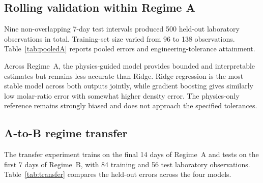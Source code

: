 \documentclass[preprint,12pt,authoryear]{elsarticle}
\begin{document}
\subsection{Rolling validation within Regime A}

Nine non-overlapping 7-day test intervals produced 500 held-out laboratory observations in total. Training-set size varied from 96 to 138 observations. Table~\ref{tab:pooledA} reports pooled errors and engineering-tolerance attainment.

\begin{table}[htbp]
\centering
\caption{Pooled held-out performance across the nine Regime-A test intervals.}
\label{tab:pooledA}
\end{table}

Across Regime~A, the physics-guided model provides bounded and interpretable estimates but remains less accurate than Ridge. Ridge regression is the most stable model across both outputs jointly, while gradient boosting gives similarly low molar-ratio error with somewhat higher density error. The physics-only reference remains strongly biased and does not approach the specified tolerances.

\subsection{A-to-B regime transfer}

The transfer experiment trains on the final 14 days of Regime~A and tests on the first 7 days of Regime~B, with 84 training and 56 test laboratory observations. Table~\ref{tab:transfer} compares the held-out errors across the four models.
\end{document}
